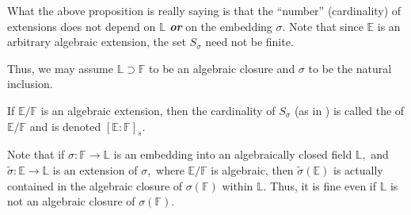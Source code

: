 \begin{center}
\end{center}  

\begin{rem}
    What the above proposition is really saying is that the ``number'' (cardinality) of extensions does not depend on $\mathbb{L}$ \textbf{\emph{or}} on the embedding $\sigma.$ Note that since $\mathbb{E}$ is an arbitrary algebraic extension, the set $S_\sigma$ need not be finite. 

    Thus, we may assume $\mathbb{L} \supset \mathbb{F}$ to be an algebraic closure and $\sigma$ to be the natural inclusion.
\end{rem}

\begin{defn}%
    If $\mathbb{E}/\mathbb{F}$ is an algebraic extension, then the cardinality of $S_\sigma$ (as in ) is called the  of $\mathbb{E}/\mathbb{F}$ and is denoted $[\mathbb{E} : \mathbb{F}]_s.$
\end{defn}

\begin{rem}
    Note that if $\sigma : \mathbb{F} \to \mathbb{L}$ is an embedding into an algebraically closed field $\mathbb{L},$ and $\widetilde{\sigma} : \mathbb{E} \to \mathbb{L}$ is an extension of $\sigma,$ where $\mathbb{E}/\mathbb{F}$ is algebraic, then $\widetilde{\sigma}(\mathbb{E})$ is actually contained in the algebraic closure of $\sigma(\mathbb{F})$ within $\mathbb{L}.$ Thus, it is fine even if $\mathbb{L}$ is not an algebraic closure of $\sigma(\mathbb{F}).$
\end{rem}

